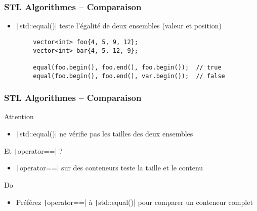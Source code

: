 \documentclass[C++.tex]{subfiles}
\begin{document}
\begin{frame}[fragile]
	\frametitle{STL Algorithmes -- Comparaison}
	\begin{itemize}
		\item \texttt|std::equal()| teste l'égalité de deux ensembles (valeur et position)
	\end{itemize}

	\begin{verbatim}
		vector<int> foo{4, 5, 9, 12};
		vector<int> bar{4, 5, 12, 9};

		equal(foo.begin(), foo.end(), foo.begin());  // true
		equal(foo.begin(), foo.end(), var.begin());  // false
	\end{verbatim}
\end{frame}

\begin{frame}[fragile]
	\frametitle{STL Algorithmes -- Comparaison}
	\begin{alertblock}{Attention}
		\begin{itemize}
			\item \texttt|std::equal()| ne vérifie pas les tailles des deux ensembles
		\end{itemize}
	\end{alertblock}


	\begin{block}{Et \texttt|operator==| ?}
		\begin{itemize}
			\item \texttt|operator==| sur des conteneurs teste la taille et le contenu
		\end{itemize}
	\end{block}

	\begin{exampleblock}{Do}
		\begin{itemize}
			\item Préférez \texttt|operator==| à \texttt|std::equal()| pour comparer un conteneur complet
		\end{itemize}
	\end{exampleblock}
\end{frame}
\end{document}
